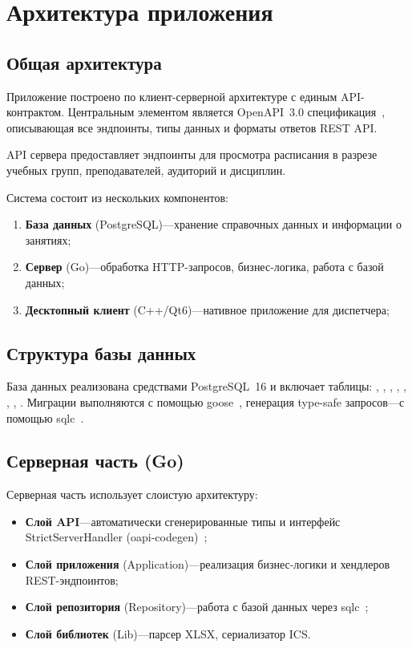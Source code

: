 \chapter{Архитектура приложения}
\label{cha:design}

\section{Общая архитектура}

Приложение построено по клиент-серверной архитектуре с единым API-контрактом. Центральным элементом является OpenAPI~3.0 спецификация~\cite{openapi:spec}, описывающая все эндпоинты, типы данных и форматы ответов REST API.

API сервера предоставляет эндпоинты для просмотра расписания в разрезе учебных групп, преподавателей, аудиторий и дисциплин.

Система состоит из нескольких компонентов:
\begin{enumerate}
\item \textbf{База данных} (PostgreSQL)---хранение справочных данных и информации о занятиях;
\item \textbf{Сервер} (Go)---обработка HTTP-запросов, бизнес-логика, работа с базой данных;
\item \textbf{Десктопный клиент} (C++/Qt6)---нативное приложение для диспетчера;
\end{enumerate}

\section{Структура базы данных}

База данных реализована средствами PostgreSQL~16 и включает таблицы: , , , , , , , . Миграции выполняются с помощью goose~\cite{goose:migrate}, генерация type-safe запросов---с помощью sqlc~\cite{sqlc:dev}.

\section{Серверная часть (Go)}

Серверная часть использует слоистую архитектуру:
\begin{itemize}
\item \textbf{Слой API}---автоматически сгенерированные типы и интерфейс StrictServerHandler (oapi-codegen)~\cite{oapi:codegen};
\item \textbf{Слой приложения} (Application)---реализация бизнес-логики и хендлеров REST-эндпоинтов;
\item \textbf{Слой репозитория} (Repository)---работа с базой данных через sqlc~\cite{sqlc:dev};
\item \textbf{Слой библиотек} (Lib)---парсер XLSX, сериализатор ICS.
\end{itemize}

